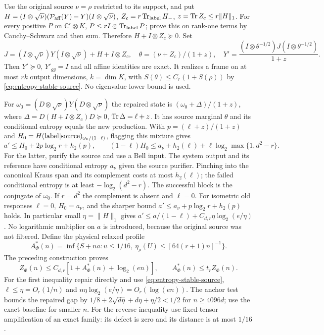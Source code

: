 Use the original source $\nu=\rho$ restricted to its support, and put
$H=(I\otimes\sqrt\nu)(\mathcal P_{\rm aff}(Y)-Y)(I\otimes\sqrt\nu)$,
$Z_c=r\operatorname{Tr}_{\rm label}H_-$, $z=\operatorname{Tr} Z_c\leq r\|H\|_1$.
For every positive $P$ on $\mathbb C^r\otimes K$,
$P\leq rI\otimes\operatorname{Tr}_{\rm label}P$; prove this on rank-one terms by
Cauchy--Schwarz and then sum. Therefore $H+I\otimes Z_c\succeq0$.
Set
\[
 J=(I\otimes\sqrt\nu)Y(I\otimes\sqrt\nu)+H+I\otimes Z_c,
 \quad\theta=(\nu+Z_c)/(1+z),\quad
 Y'=\frac{(I\otimes\theta^{-1/2})J(I\otimes\theta^{-1/2})}{1+z}.
\]
Then $Y'\succeq0$, $Y'_{gg}=I$ and all affine identities are exact.
It realizes a frame on at most $rk$ output dimensions, $k=\dim K$,
with $S(\theta)\leq C_r(1+S(\rho))$ by
\eqref{eq:entropy-stable-source}. No eigenvalue lower bound is used.

For $\omega_0=(D\otimes\sqrt\nu)Y(D\otimes\sqrt\nu)$ the repaired
state is $(\omega_0+\Delta)/(1+z)$, where
$\Delta=D(H+I\otimes Z_c)D\succeq0$, $\operatorname{Tr}\Delta=\ell+z$.
It has source marginal $\theta$ and its conditional entropy equals
the new production. With $p=(\ell+z)/(1+z)$ and
$H_0=H({\rm label}|{\rm source})_{\omega_0/(1-\ell)}$, flagging this
mixture gives
\[
 a'\leq H_0+2p\log_2r+h_2(p),\qquad
 (1-\ell)H_0\leq a_\nu+h_2(\ell)
       +\ell\log_2\max\{1,d^2-r\}.
\]
For the latter, purify the source and use a Bell input. The system
output and its reference have conditional entropy $a_\nu$ given the
source purifier. Pinching into the canonical Kraus span and its
complement costs at most $h_2(\ell)$; the failed conditional entropy
is at least $-\log_2(d^2-r)$. The successful block is the conjugate
of $\omega_0$. If $r=d^2$ the complement is absent and $\ell=0$.
For isometric old responses $\ell=0$, $H_0=a_\nu$, and the sharper
bound $a'\leq a_\nu+p\log_2r+h_2(p)$ holds.
In particular small $\eta=\|H\|_1$ gives
$a'\leq a/(1-\ell)+C_{d,r}\eta\log_2(e/\eta)$.
No logarithmic multiplier on $a$ is introduced, because the original
source was not filtered.
Define the physical relaxed profile
\[
 A_\Phi^*(n)=\inf\{S+na:u\leq1/16,
        \ \eta_\rho(U)\leq[64(r+1)n]^{-1}\}.
\]
The preceding construction proves
\begin{equation}\label{eq:affine-profile}
 Z_\Phi(n)\leq C_{d,r}[1+A_\Phi^*(n)+\log_2(en)],\qquad
 A_\Phi^*(n)\leq t_rZ_\Phi(n).
\end{equation}
For the first inequality repair directly and use
\eqref{eq:entropy-stable-source}, $\ell\leq\eta=O_r(1/n)$ and
$n\eta\log_2(e/\eta)=O_r(\log(en))$.
The anchor test bounds the repaired gap by
$1/8+2\sqrt{d\eta}+d\eta+\eta/2<1/2$
for $n\geq4096d$; use the exact baseline for smaller $n$.
For the reverse inequality use fixed tensor amplification of an
exact family: its defect is zero and its distance is at most $1/16$.

